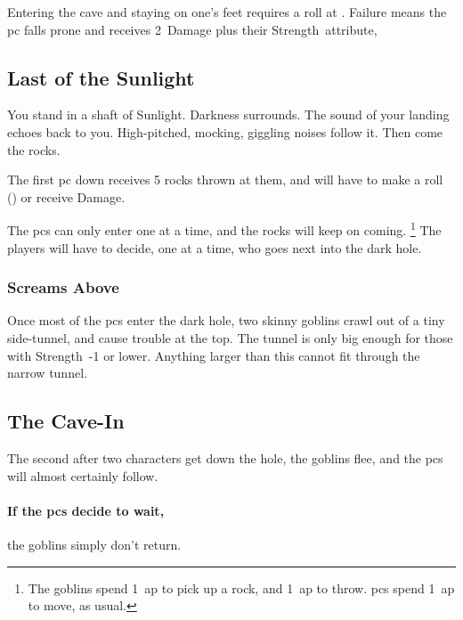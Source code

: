 \begin{multicols}{2}
Entering the cave and staying on one's feet requires a  roll at \tn[6].
Failure means the \gls{pc} falls prone%
and receives 2~Damage plus their Strength~\gls{attribute},

\label{goblinCaveEntrance}

\subsection{Last of the Sunlight}

\begin{boxtext}
  You stand in a shaft of Sunlight.
  Darkness surrounds.
  The sound of your landing echoes back to you.
  High-pitched, mocking, giggling noises follow it.
  Then come the rocks.
\end{boxtext}

The first \gls{pc} down receives 5 rocks thrown at them, and will have to make a  roll (\tn[10]) or receive  Damage.

The \glspl{pc} can only enter one at a time, and the rocks will keep on coming.%
\footnote{The goblins spend 1~\gls{ap} to pick up a rock, and 1~\gls{ap} to throw.
\Glspl{pc} spend 1~\gls{ap} to move, as usual.}
The players will have to decide, one at a time, who goes next into the dark hole.

\playCommentaryDust[t]

\subsubsection{Screams Above}

Once most of the \glspl{pc} enter the dark hole, two skinny goblins crawl out of a tiny side-tunnel, and cause trouble at the top.
The tunnel is only big enough for those with Strength~-1 or lower.
Anything larger than this cannot fit through the narrow tunnel.

\subsection{The Cave-In}
\label{caveIn}

The second after two characters get down the hole, the goblins flee, and the \glspl{pc} will almost certainly follow.

\paragraph{If the \glspl{pc} decide to wait,}
the goblins simply don't return.


\end{multicols}
